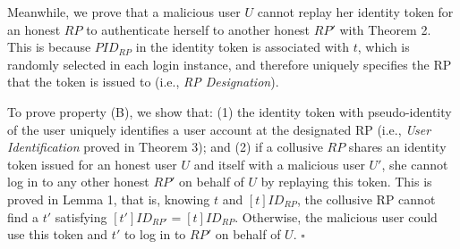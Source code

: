 Meanwhile, we prove that a malicious user $U$ cannot replay her identity token for an honest $RP$ to authenticate herself to another honest $RP'$ with Theorem 2. This is because $PID_{RP}$ in the identity token is associated with $t$, which is randomly selected in each login instance, and therefore uniquely specifies the RP that the token is issued to (i.e., {\em RP Designation}). 

To prove property (B), we show that: (1) the identity token with pseudo-identity of the user uniquely identifies a user account at the designated RP (i.e., {\em User Identification} proved in Theorem 3); and (2) if a collusive $RP$ shares an identity token issued for an honest user $U$ and itself with a malicious user $U'$, she cannot log in to any other honest $RP'$ on behalf of $U$ by replaying this token. This is proved in Lemma 1, that is, knowing $t$ and $[t]ID_{RP}$, the collusive RP cannot find a $t'$ satisfying $[t']ID_{RP'}=[t]ID_{RP}$. Otherwise, the malicious user could use this token and $t'$ to log in to $RP'$ on behalf of $U$. \hfill $\square$

